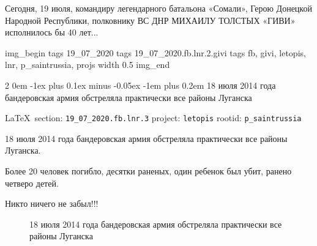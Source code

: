 \documentclass[a4paper,11pt]{extreport}
\makeatletter
\renewcommand\subsection{%
  \clearpage
    \@startsection{subsection}%
    {2}%
    {0em}%
    {-1ex plus 0.1ex minus -0.05ex}%
    {-1em plus 0.2em}%
    {\scshape\bfseries\Large}%
}
\makeatother
\begin{document}
Сегодня, 19 июля, командиру легендарного батальона «Сомали», Герою Донецкой
Народной Республики, полковнику ВС ДНР МИХАИЛУ ТОЛСТЫХ «ГИВИ» исполнилось бы 40
лет...

\ifcmt
	img_begin 
		tags 19_07_2020
		tags 19_07_2020.fb.lnr.2.givi
		tags fb, givi, letopis, lnr, p_saintrussia, projs
		width 0.5
	img_end
\fi
  
 
 

\subsection{18 июля 2014 года бандеровская армия обстреляла практически все районы Луганска}
\label{sec:19_07_2020.fb.lnr.3}
  
\vspace{0.5cm}
{\small\LaTeX~section: \verb|19_07_2020.fb.lnr.3| project: \verb|letopis| rootid: \verb|p_saintrussia|}
\vspace{0.5cm}
  
18 июля 2014 года бандеровская армия обстреляла практически все районы
Луганска.

Более 20 человек погибло, десятки раненых, один ребенок был убит, ранено
четверо детей.

Никто ничего не забыл!!!

\begin{figure}[ht]
 \centering
 \caption{18 июля 2014 года бандеровская армия обстреляла практически все районы Луганска}
\end{figure}
 
 
\end{document}
